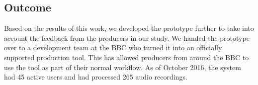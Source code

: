 













\subsection{Outcome}
Based on the results of this work, we developed the prototype further to take into account the feedback from the
producers in our study.  We handed the prototype over to a development team at the BBC who turned it into an
officially supported production tool.  This has allowed producers from around the BBC to use the tool as part of their
normal workflow.  As of October 2016, the system had 45 active users and had processed 265 audio recordings.

